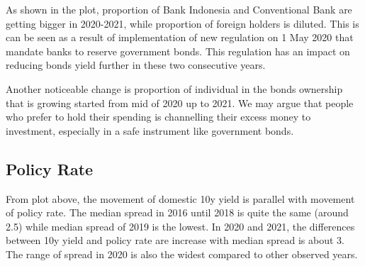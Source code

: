 \documentclass[11pt,a4paper,]{article}
\begin{document}
As shown in the plot, proportion of Bank Indonesia and Conventional Bank are getting bigger in 2020-2021, while proportion of foreign holders is diluted. This is can be seen as a result of implementation of new regulation on 1 May 2020 that mandate banks to reserve government bonds. This regulation has an impact on reducing bonds yield further in these two consecutive years.

Another noticeable change is proportion of individual in the bonds ownership that is growing started from mid of 2020 up to 2021. We may argue that people who prefer to hold their spending is channelling their excess money to investment, especially in a safe instrument like government bonds.

\hypertarget{policy-rate}{%
\subsection{Policy Rate}\label{policy-rate}}

From plot above, the movement of domestic 10y yield is parallel with movement of policy rate. The median spread in 2016 until 2018 is quite the same (around 2.5) while median spread of 2019 is the lowest. In 2020 and 2021, the differences between 10y yield and policy rate are increase with median spread is about 3. The range of spread in 2020 is also the widest compared to other observed years.

\printbibliography[title=Bibliography]
\end{document}
